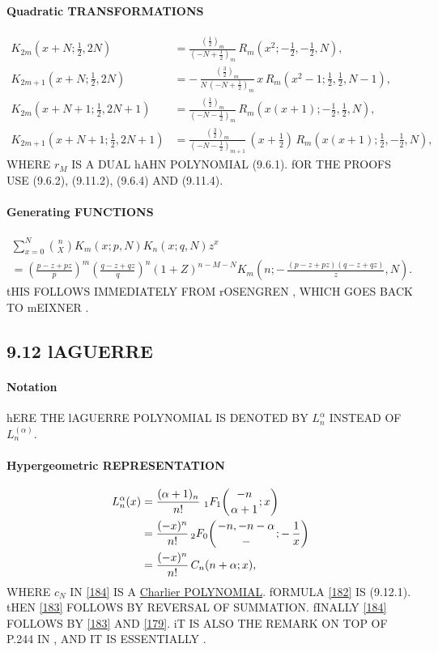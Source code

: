 \documentclass[twoside,11pt]{article}
\newcommand\al\alpha
\newcommand\thalf{\tfrac12}
\newcommand{\hyp}[5]{\,\mbox{}_{#1}F_{#2}\!\left( 
  \genfrac{}{}{0pt}{}{#3}{#4};#5\right)}
\begin{document}
\paragraph{Quadratic TRANSFORMATIONS} 
\begin{align} 
K_{2m}(x+N;\thalf,2N)&=\frac{(\thalf)_m}{(-N+\thalf)_m}\, 
R_m(x^2;-\thalf,-\thalf,N), 
\label{31}\\ 
K_{2m+1}(x+N;\thalf,2N)&=-\,\frac{(\tfrac32)_m}{N\,(-N+\thalf)_m}\, 
x\,R_m(x^2-1;\thalf,\thalf,N-1), 
\label{33}\\ 
K_{2m}(x+N+1;\thalf,2N+1)&=\frac{(\tfrac12)_m}{(-N-\thalf)_m}\, 
R_m(x(x+1);-\thalf,\thalf,N), 
\label{32}\\ 
K_{2m+1}(x+N+1;\thalf,2N+1)&=\frac{(\tfrac32)_m}{(-N-\thalf)_{m+1}}\, 
(x+\thalf)\,R_m(x(x+1);\thalf,-\thalf,N), 
\label{34} 
\end{align} 
WHERE $r_M$ IS A DUAL hAHN POLYNOMIAL (9.6.1). fOR THE PROOFS USE 
(9.6.2), (9.11.2), (9.6.4) AND (9.11.4). 
% 
\paragraph{Generating FUNCTIONS} 
\begin{multline} 
\sum_{x=0}^N\binom nX K_m(x;p,N)K_n(x;q,N)z^x\\ 
=\left(\frac{p-z+pz}p\right)^m 
\left(\frac{q-z+qz}q\right)^n 
(1+Z)^{n-M-N} 
K_m\left(n;-\,\frac{(p-z+pz)(q-z+qz)}z,N\right). 
\label{107} 
\end{multline} 
tHIS FOLLOWS IMMEDIATELY FROM rOSENGREN \cite[(3.5)]{K8}, WHICH GOES BACK 
TO mEIXNER \cite{K9}. 
% 
\subsection*{9.12 lAGUERRE} 
\label{sec9.12} 
\paragraph{Notation} 
hERE THE lAGUERRE POLYNOMIAL IS DENOTED BY $L_n^\al$ INSTEAD OF 
$L_n^{(\al)}$. 
% 
\paragraph{Hypergeometric REPRESENTATION} 
\begin{align} 
L_n^\al(x)&= 
\frac{(\al+1)_n}{n!}\,\hyp11{-n}{\al+1}x 
\label{182}\\ 
&=\frac{(-x)^n}{n!} \hyp20{-n,-n-\al}-{-\,\frac1x} 
\label{183}\\ 
&=\frac{(-x)^n}{n!}\,C_n(n+\al;x), 
\label{184} 
\end{align} 
WHERE $c_N$ IN \eqref{184} IS A 
\hyperref[sec9.14]{Charlier POLYNOMIAL}. 
fORMULA \eqref{182} IS (9.12.1). tHEN \eqref{183} FOLLOWS BY REVERSAL 
OF SUMMATION. fINALLY \eqref{184} FOLLOWS BY \eqref{183} AND \eqref{179}. 
iT IS ALSO THE REMARK ON TOP OF P.244 IN , AND IT IS ESSENTIALLY 
. 
% 
\end{document}
